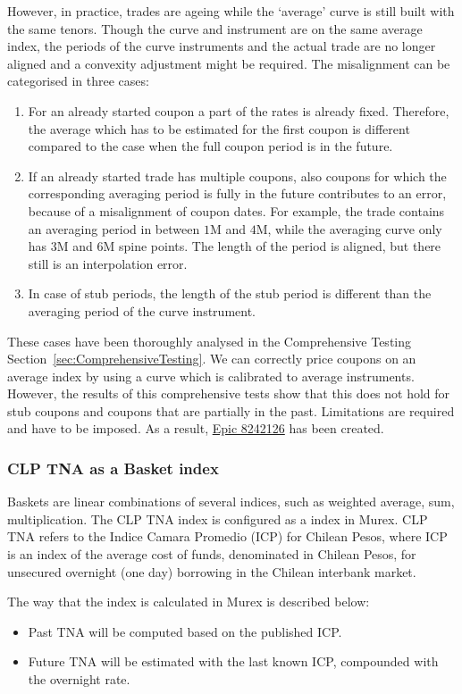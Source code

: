 \documentclass[]{pmv_report} %
\begin{document}
However, in practice, trades are ageing while the `average' curve is still built with the same tenors.
Though the curve and instrument are on the same average index, the periods of the curve instruments and the actual trade are no longer aligned and a convexity adjustment might be required.
The misalignment can be categorised in three cases:
\begin{enumerate}
 \item For an already started coupon a part of the rates is already fixed.
 Therefore, the average which has to be estimated for the first coupon is different compared to the case when the full coupon period is in the future.
 \item If an already started trade has multiple coupons, also coupons for which the corresponding averaging period is fully in the future contributes to an error, because of a misalignment of coupon dates.
 For example, the trade contains an averaging period in between $1$M and $4$M, while the averaging curve only has $3$M and $6$M spine points.
 The length of the period is aligned, but there still is an interpolation error.
 \item In case of stub periods, the length of the stub period is different than the averaging period of the curve instrument.
\end{enumerate}
These cases have been thoroughly analysed in the Comprehensive Testing Section~\ref{sec:ComprehensiveTesting}.
We can correctly price coupons on an average index by using a curve which is calibrated to average instruments.
However, the results of this comprehensive tests show that this does not hold for stub coupons and coupons that are partially in the past.
Limitations are required and have to be imposed.
As a result, \href{https://dev.azure.com/raboweb/PMVProjectList/_workitems/edit/8242126}{{\color{blue}Epic 8242126}} has been created.

\subsubsection{CLP TNA as a Basket index}
Baskets are linear combinations of several indices, such as weighted average, sum, multiplication.
The CLP TNA index is configured as a  index in Murex.
CLP TNA refers to the Indice Camara Promedio (ICP) for Chilean Pesos, where ICP is an index of the average cost of funds, denominated in Chilean Pesos, for unsecured overnight (one day) borrowing in the Chilean interbank market.

The way that the index is calculated in Murex is described below:
\begin{itemize}
  \item Past TNA will be computed based on the published ICP.
  \item Future TNA will be estimated with the last known ICP, compounded with the overnight rate.
\end{itemize}
\end{document}
